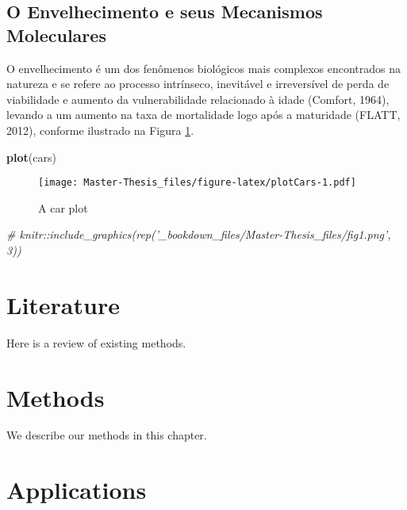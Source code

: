 \documentclass[]{book}
\newenvironment{Shaded}{\begin{snugshade}}{\end{snugshade}}
\newcommand{\CommentTok}[1]{\textcolor[rgb]{0.56,0.35,0.01}{\textit{#1}}}
\newcommand{\KeywordTok}[1]{\textcolor[rgb]{0.13,0.29,0.53}{\textbf{#1}}}
\newcommand{\NormalTok}[1]{#1}
\begin{document}
\hypertarget{o-envelhecimento-e-seus-mecanismos-moleculares}{%
\section{O Envelhecimento e seus Mecanismos Moleculares}\label{o-envelhecimento-e-seus-mecanismos-moleculares}}

O envelhecimento é um dos fenômenos biológicos mais complexos encontrados
na natureza e se refere ao processo intrínseco, inevitável e irreversível de perda de
viabilidade e aumento da vulnerabilidade relacionado à idade (Comfort, 1964), levando
a um aumento na taxa de mortalidade logo após a maturidade (FLATT, 2012),
conforme ilustrado na Figura \ref{fig:plotCars}.

\begin{Shaded}
\begin{Highlighting}[]
\KeywordTok{plot}\NormalTok{(cars)}
\end{Highlighting}
\end{Shaded}

\begin{figure}
\centering
\texttt{[image: Master-Thesis\_files/figure-latex/plotCars-1.pdf]}
\caption{\label{fig:plotCars}A car plot}
\end{figure}

\begin{Shaded}
\begin{Highlighting}[]
\CommentTok{# knitr::include_graphics(rep('_bookdown_files/Master-Thesis_files/fig1.png', 3))}
\end{Highlighting}
\end{Shaded}

\hypertarget{literature}{%
\chapter{Literature}\label{literature}}

Here is a review of existing methods.

\hypertarget{methods}{%
\chapter{Methods}\label{methods}}

We describe our methods in this chapter.

\hypertarget{applications}{%
\chapter{Applications}\label{applications}}
\end{document}
